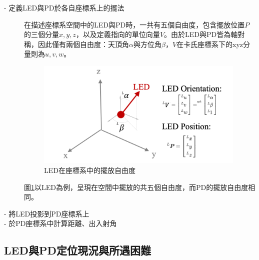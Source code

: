     \begin{description}

        \item[- 定義LED與PD於各自座標系上的擺法]\hfill 
        
        \qquad
        在描述座標系空間中的LED與PD時，一共有五個自由度，包含擺放位置$P$的三個分量$x,y,z$，以及定義指向的單位向量$V$。由於LED與PD皆為軸對稱，因此僅有兩個自由度：天頂角$\alpha$與方位角$\beta$，$V$在卡氏座標系下的xyz分量則為$u,v,w$。

        \begin{figure}[ht]
            \centering
            \includegraphics[width=10cm]{ch2pic/LED_config.png}
            \caption{LED在座標系中的擺放自由度}
            \label{pic:led_config}
        \end{figure}

        \qquad
        圖\ref{pic:led_config}以LED為例，呈現在空間中擺放的共五個自由度，而PD的擺放自由度相同。

        \item[- 將LED投影到PD座標系上]\hfill 
        
        \qquad

        \item[- 於PD座標系中計算距離、出入射角]\hfill 
        
        
        \qquad

    \end{description}   


        


















    \subsection{LED與PD定位現況與所遇困難}
    \label{chp:LEDPD_problem}



